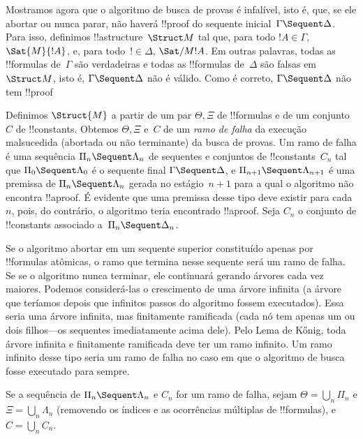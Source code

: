 \documentclass[../../../include/open-logic-section]{subfiles}
\begin{document}


Mostramos agora que o algoritmo de busca de provas é infalível, isto é,
que, se ele abortar ou nunca parar, não haverá !!{proof} do sequente
inicial~$\Gamma \Sequent \Delta$. Para isso, definimos
!!a{structure}~$\Struct M$ tal que, para todo $!A \in \Gamma$,
$\Sat{M}{!A}$, e, para todo~$! \in \Delta$, $\Sat/{M}{!A}$. Em outras
palavras, todas as !!{formula}s de~$\Gamma$ são verdadeiras e todas as
!!{formula}s de~$\Delta$ são falsas em~$\Struct M$, isto é, $\Gamma
\Sequent \Delta$ não é válido. Como  é correto, $\Gamma
\Sequent \Delta$ não tem !!{proof}

Definimos $\Struct{M}$ a partir de um par $\Theta, \Xi$ de
!!{formula}s e de um conjunto~$C$ de !!{constant}s. Obtemos $\Theta,
\Xi$ e~$C$ de um \emph{ramo de falha} da execução malsucedida (abortada
ou não terminante) da busca de provas. Um ramo de falha é uma sequência
$\Pi_n \Sequent \Lambda_n$ de sequentes e conjuntos de
!!{constant}s~$C_n$ tal que $\Pi_0 \Sequent \Lambda_0$ é o sequente
final $\Gamma \Sequent \Delta$, e $\Pi_{n+1} \Sequent \Lambda_{n+1}$
é uma premissa de $\Pi_n \Sequent \Lambda_n$ gerada no estágio~$n+1$
para a qual o algoritmo não encontra !!a{proof}. É evidente que uma
premissa desse tipo deve existir para cada~$n$, pois, do contrário, o
algoritmo teria encontrado !!a{proof}. Seja $C_n$ o conjunto de
!!{constant}s associado a~$\Pi_n \Sequent \Delta_n$.

Se o algoritmo abortar em um sequente superior constituído apenas por
!!{formula}s atômicas, o ramo que termina nesse sequente será um ramo
de falha. Se se o algoritmo nunca terminar, ele continuará gerando
árvores cada vez maiores. Podemos considerá-las o crescimento de uma
árvore infinita (a árvore que teríamos depois que infinitos passos do
algoritmo fossem executados). Essa seria uma árvore infinita, mas
finitamente ramificada (cada nó tem apenas um ou dois filhos---os
sequentes imediatamente acima dele). Pelo Lema de K\H{o}nig, toda
árvore infinita e finitamente ramificada deve ter um ramo infinito. Um
ramo infinito desse tipo seria um ramo de falha no caso em que o
algoritmo de busca fosse executado para sempre.

Se a sequência de $\Pi_n \Sequent \Lambda_n$ e $C_n$ for um ramo de
falha, sejam $\Theta = \bigcup_n \Pi_n$ e $\Xi = \bigcup_n \Lambda_n$
(removendo os índices e as ocorrências múltiplas de !!{formula}s), e
$C = \bigcup_n C_n$.
\end{document}
